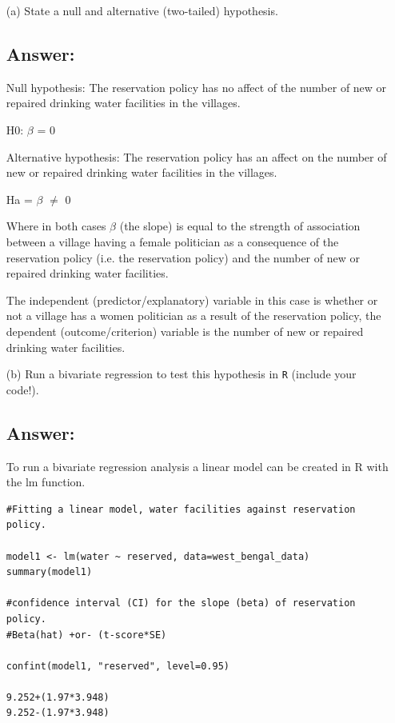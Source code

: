 \documentclass[12pt,letterpaper]{article}
\begin{document}
\newpage
\begin{enumerate}
	\item [(a)] State a null and alternative (two-tailed) hypothesis.
	\subsection*{Answer:} 
	Null hypothesis: The reservation policy has no affect of the number of new or repaired drinking water facilities in the villages.
	\vspace{0.2cm}
	
	H0: $\beta$ = 0
	
	Alternative hypothesis: The reservation policy has an affect on the number of new or repaired drinking water facilities in the villages.
	\vspace{0.2cm}
	
	Ha = $\beta$ $\neq$ 0
	
	
	Where in both cases $\beta$ (the slope) is equal to the strength of association between a village having a female politician as a consequence of the reservation policy (i.e. the reservation policy) and the number of new or repaired drinking water facilities.
	\vspace{0.5cm}
	
	The independent (predictor/explanatory) variable in this case is whether or not a village has a women politician as a result of the reservation policy, the dependent (outcome/criterion) variable is the number of new or repaired drinking water facilities.
	\vspace{1cm}
	\item [(b)] Run a bivariate regression to test this hypothesis in \texttt{R} (include your code!).
	
	\subsection*{Answer:}
	To run a bivariate regression analysis a linear model can be created in R with the lm function.
	\begin{Verbatim}
#Fitting a linear model, water facilities against reservation policy.
		
model1 <- lm(water ~ reserved, data=west_bengal_data)
summary(model1)
		
#confidence interval (CI) for the slope (beta) of reservation policy.
#Beta(hat) +or- (t-score*SE)

confint(model1, "reserved", level=0.95)

9.252+(1.97*3.948)
9.252-(1.97*3.948)


\end{Verbatim}
\end{enumerate}
\end{document}
